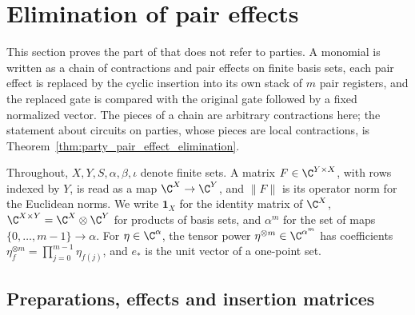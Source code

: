 \section{Elimination of pair effects}
\label{sec:party_effect_elimination}

This section proves the part of \cite[Lemma~5.1]{OpenAI2026PolynomialPEPS}
that does not refer to parties. A monomial is written as a chain of
contractions and pair effects on finite basis sets, each pair effect is
replaced by the cyclic insertion into its own stack of $m$ pair registers,
and the replaced gate is compared with the original gate followed by a
fixed normalized vector. The pieces of a chain are arbitrary contractions
here; the statement about circuits on parties, whose pieces are local
contractions, is Theorem~\ref{thm:party_pair_effect_elimination}.

Throughout, $X,Y,S,\alpha,\beta,\iota$ denote finite sets. A matrix
$F\in\C^{Y\times X}$, with rows indexed by $Y$, is read as a map
$\C^X\to\C^Y$, and $\lVert F\rVert$ is its operator norm for the Euclidean
norms. We write $\mathbf 1_X$ for the identity matrix of $\C^X$,
$\C^{X\times Y}=\C^X\otimes\C^Y$ for products of basis sets, and
$\alpha^m$ for the set of maps $\{0,\dots,m-1\}\to\alpha$. For
$\eta\in\C^\alpha$, the tensor power $\eta^{\otimes m}\in\C^{\alpha^m}$
has coefficients $\eta^{\otimes m}_f=\prod_{j=0}^{m-1}\eta_{f(j)}$, and
$e_*$ is the unit vector of a one-point set.

\subsection{Preparations, effects and insertion matrices}
\label{sec:party_effect_matrices}

